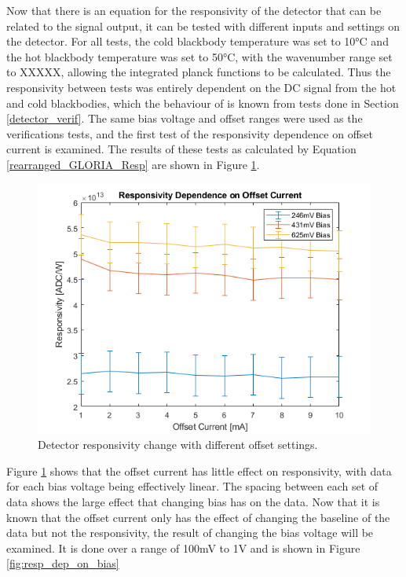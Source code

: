 Now that there is an equation for the responsivity of the detector that can be related to the signal output, it can be tested with different inputs and settings on the detector. For all tests, the cold blackbody temperature was set to 10°C and the hot blackbody temperature was set to 50°C, with the wavenumber range set to XXXXX, allowing the integrated planck functions to be calculated. Thus the responsivity between tests was entirely dependent on the DC signal from the hot and cold blackbodies, which the behaviour of is known from tests done in Section \ref{detector_verif}. The same bias voltage and offset ranges were used as the verifications tests, and the first test of the responsivity dependence on offset current is examined. The results of these tests as calculated by Equation \ref{rearranged_GLORIA_Resp} are shown in Figure \ref{fig:resp_dep_on_offset}.

\begin{figure}[h]
  \includegraphics[width=\linewidth]{chap6_images/verification/resp_dependence_on_offset.png}
  \caption{Detector responsivity change with different offset settings.}
  \label{fig:resp_dep_on_offset}
\end{figure}

Figure \ref{fig:resp_dep_on_offset} shows that the offset current has little effect on responsivity, with data for each bias voltage being effectively linear. The spacing between each set of data shows the large effect that changing bias has on the data. Now that it is known that the offset current only has the effect of changing the baseline of the data but not the responsivity, the result of changing the bias voltage will be examined. It is done over a range of 100mV to 1V and is shown in Figure \ref{fig:resp_dep_on_bias}

